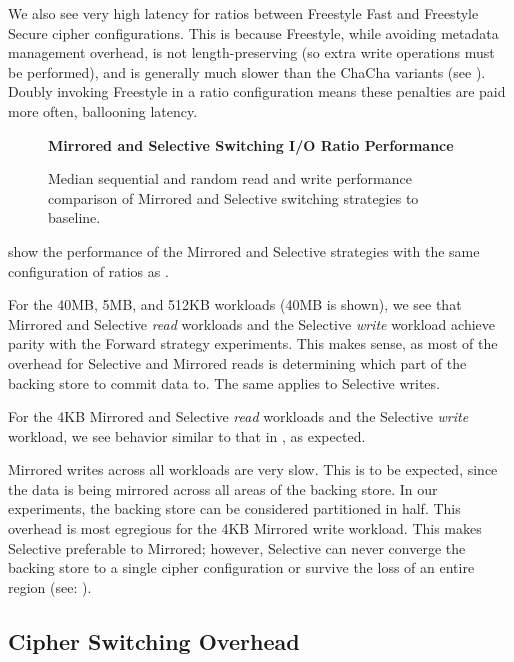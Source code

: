 We also see very high latency for ratios between Freestyle Fast and Freestyle
Secure cipher configurations. This is because Freestyle, while avoiding metadata
management overhead, is not length-preserving (so extra write operations must be
performed), and is generally much slower than the ChaCha variants (see
). Doubly invoking Freestyle in a ratio configuration
means these penalties are paid more often, ballooning latency.

\begin{figure}[ht]
  \textbf{Mirrored and Selective Switching I/O Ratio Performance}\par\medskip
  \centering
  {} \caption{Median sequential
  and random read and write performance comparison of Mirrored and Selective
  switching strategies to baseline.}
 \label{fig:mirrored-selective-baseline}
\end{figure}

 show the performance of the Mirrored and
Selective strategies with the same configuration of ratios as
.

For the 40MB, 5MB, and 512KB workloads (40MB is shown), we see that Mirrored and
Selective \emph{read} workloads and the Selective \emph{write} workload achieve
parity with the Forward strategy experiments. This makes sense, as most of the
overhead for Selective and Mirrored reads is determining which part of the
backing store to commit data to. The same applies to Selective writes.

For the 4KB Mirrored and Selective \emph{read} workloads and the Selective
\emph{write} workload, we see behavior similar to that in
, as expected.

Mirrored writes across all workloads are very slow. This is to be expected,
since the data is being mirrored across all areas of the backing store. In our
experiments, the backing store can be considered partitioned in half. This
overhead is most egregious for the 4KB Mirrored write workload. This makes
Selective preferable to Mirrored; however, Selective can never converge the
backing store to a single cipher configuration or survive the loss of an entire
region (see: ).

\subsection{Cipher Switching Overhead} \label{subsec:3}


